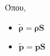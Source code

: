 Όπου,

\begin{itemize}
    \item $\mathbf{\widetilde{\rho} =\rho S}$
    \item $\mathbf{\tilde{p} = pS}$
\end{itemize}
